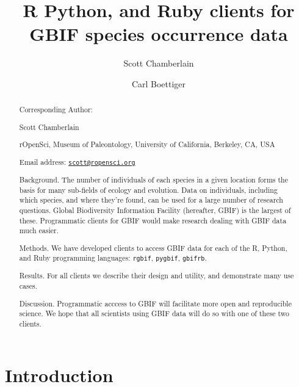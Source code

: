 \documentclass[author-year, review, 11pt]{components/elsarticle} %
\begin{document}
\begin{frontmatter}

  \title{R Python, and Ruby clients for GBIF species occurrence data}
    \author[cstar]{Scott Chamberlain}
    \author[boettig]{Carl Boettiger}
  
      \address[cstar]{rOpenSci, Museum of Paleontology, University of California, Berkeley,
CA, USA}
    \address[boettig]{rOpenSci, Department of Enivornmental Science, Policy and Management,
University of California, Berkeley, CA, USA}
  
  \begin{abstract}
  Corresponding Author:
  
  Scott Chamberlain
  
  rOpenSci, Museum of Paleontology, University of California, Berkeley,
  CA, USA
  
  Email address:
  \href{mailto:scott@ropensci.org}{\nolinkurl{scott@ropensci.org}}
  
  \newpage
  
  Background. The number of individuals of each species in a given
  location forms the basis for many sub-fields of ecology and evolution.
  Data on individuals, including which species, and where they're found,
  can be used for a large number of research questions. Global
  Biodiversity Information Facility (hereafter, GBIF) is the largest of
  these. Programmatic clients for GBIF would make research dealing with
  GBIF data much easier.
  
  Methods. We have developed clients to access GBIF data for each of the
  R, Python, and Ruby programming languages: \texttt{rgbif},
  \texttt{pygbif}, \texttt{gbifrb}.
  
  Results. For all clients we describe their design and utility, and
  demonstrate many use cases.
  
  Discussion. Programmatic acccess to GBIF will facilitate more open and
  reproducible science. We hope that all scientists using GBIF data will
  do so with one of these two clients.
  \end{abstract}
  
 \end{frontmatter}


\newpage

\section{Introduction}\label{introduction}
\end{document}
